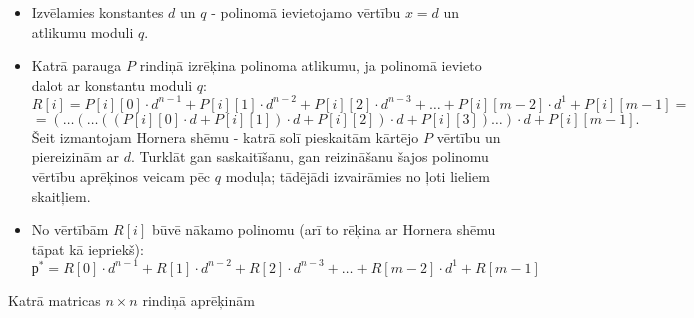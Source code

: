 \documentclass[11pt]{article}
\begin{document}
\begin{itemize}
\item
Izvēlamies konstantes $d$ un $q$ - polinomā ievietojamo vērtību $x = d$ un atlikumu moduli $q$.

\item
Katrā parauga $P$ rindiņā izrēķina polinoma atlikumu, ja polinomā ievieto dalot ar konstantu moduli $q$:
$$R[i] = P[i][0]\cdot d^{n-1} + P[i][1]\cdot d^{n-2} + P[i][2]\cdot d^{n-3} + \ldots + P[i][m-2] \cdot d^1 + P[i][m-1] =$$
$$=(\ldots{} (\ldots{}((P[i][0] \cdot d + P[i][1]) \cdot d + P[i][2]) \cdot d + P[i][3] )  \ldots{} ) \cdot d + P[i][m-1].$$
Šeit izmantojam Hornera shēmu - katrā solī pieskaitām kārtējo $P$ vērtību un piereizinām ar $d$. Turklāt
gan saskaitīšanu, gan reizināšanu šajos polinomu vērtību aprēķinos veicam pēc $q$ moduļa; tādējādi
izvairāmies no ļoti lieliem skaitļiem.
\item
No vērtībām $R[i]$ būvē nākamo polinomu (arī to rēķina ar Hornera shēmu tāpat kā iepriekš):
$$р^{\ast} = R[0]\cdot d^{n-1} + R[1]\cdot d^{n-2} + R[2]\cdot d^{n-3} + \ldots + R[m-2] \cdot d^1 + R[m-1]$$
\end{itemize}


Katrā matricas $n \times n$ rindiņā aprēķinām
\end{document}
